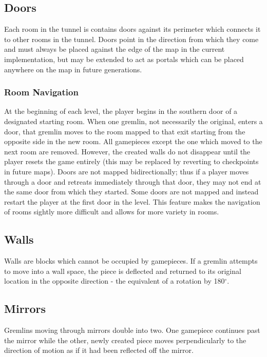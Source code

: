 \documentclass{scrreprt}
\newcommand{\degree}{$^\circ$}
\begin{document}
			\subsection{Doors}
				Each room in the tunnel is contains doors against its perimeter which connects it to other rooms in the tunnel. Doors point in the direction from which they come and must always be placed against the edge of the map in the current implementation, but may be extended to act as portals which can be placed anywhere on the map in future generations. 
			
				\subsubsection{Room Navigation}
					At the beginning of each level, the player begins in the southern door of a designated starting room. When one gremlin, not necessarily the original, enters a door, that gremlin moves to the room mapped to that exit starting from the opposite side in the new room. All gamepieces except the one which moved to the next room are removed. However, the created walls do not disappear until the player resets the game entirely (this may be replaced by reverting to checkpoints in future maps). Doors are not mapped bidirectionally; thus if a player moves through a door and retreats immediately through that door, they may not end at the same door from which they started. Some doors are not mapped and instead restart the player at the first door in the level. This feature makes the navigation of rooms sightly more difficult and allows for more variety in rooms. 
			
			\subsection{Walls}
				Walls are blocks which cannot be occupied by gamepieces. If a gremlin attempts to move into a wall space, the piece is deflected and returned to its original location in the opposite direction - the equivalent of a rotation by 180\degree. 
			
			\subsection{Mirrors}
				Gremlins moving through mirrors double into two. One gamepiece continues past the mirror while the other, newly created piece moves perpendicularly to the direction of motion as if it had been reflected off the mirror. 
			
\end{document}

